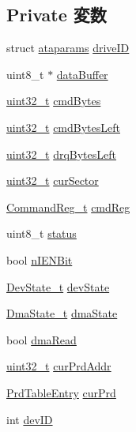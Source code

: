\subsection*{Private 変数}
\begin{DoxyCompactItemize}
\item 
struct \hyperlink{structataparams}{ataparams} \hyperlink{classIdeDisk_ae8a5371b95892db84d2b7ecef320d8a9}{driveID}
\item 
uint8\_\-t $\ast$ \hyperlink{classIdeDisk_a54aefba7f330b07a06f4c9447e582f09}{dataBuffer}
\item 
\hyperlink{Type_8hh_a435d1572bf3f880d55459d9805097f62}{uint32\_\-t} \hyperlink{classIdeDisk_a732862da3f80cd2b8eaba9425c8415f5}{cmdBytes}
\item 
\hyperlink{Type_8hh_a435d1572bf3f880d55459d9805097f62}{uint32\_\-t} \hyperlink{classIdeDisk_a70940fc29adad666da15b3d4c11ac2ff}{cmdBytesLeft}
\item 
\hyperlink{Type_8hh_a435d1572bf3f880d55459d9805097f62}{uint32\_\-t} \hyperlink{classIdeDisk_a93e2e2892d126eac3ce8dbb514d44c31}{drqBytesLeft}
\item 
\hyperlink{Type_8hh_a435d1572bf3f880d55459d9805097f62}{uint32\_\-t} \hyperlink{classIdeDisk_af7d6af3e55b20feac31aac92469e56f3}{curSector}
\item 
\hyperlink{structCommandReg}{CommandReg\_\-t} \hyperlink{classIdeDisk_a2d468138409fc099c81da8d9b62f1f0f}{cmdReg}
\item 
uint8\_\-t \hyperlink{classIdeDisk_ade818037fd6c985038ff29656089758d}{status}
\item 
bool \hyperlink{classIdeDisk_ad58649fd94c5f762267f1d7bf682f6ca}{nIENBit}
\item 
\hyperlink{ide__disk_8hh_abe49db4804c1744e30c8df026681eaf0}{DevState\_\-t} \hyperlink{classIdeDisk_a5fb52a264b2cccb6ccad92493dff5deb}{devState}
\item 
\hyperlink{ide__disk_8hh_a398a1d251e78562f1eccfb43ad5fdf49}{DmaState\_\-t} \hyperlink{classIdeDisk_acdefad9ebc91ac85f00ff92347b944d7}{dmaState}
\item 
bool \hyperlink{classIdeDisk_a3f1cf4317e46c3c845d144c5e0334096}{dmaRead}
\item 
\hyperlink{Type_8hh_a435d1572bf3f880d55459d9805097f62}{uint32\_\-t} \hyperlink{classIdeDisk_a13b6a0a9519069583d8648b3eafa0448}{curPrdAddr}
\item 
\hyperlink{classPrdTableEntry}{PrdTableEntry} \hyperlink{classIdeDisk_a550dda68894801d065c57391335a8590}{curPrd}
\item 
int \hyperlink{classIdeDisk_a5f20adde61bc73f1275a1a35481a011d}{devID}

\end{DoxyCompactItemize}

